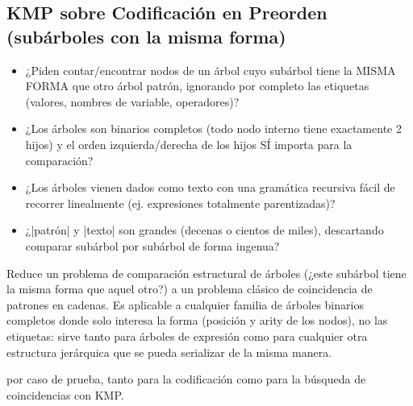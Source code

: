\subsection{KMP sobre Codificación en Preorden (subárboles con la misma forma)}
\label{alg:9-3}


\begin{itemize}
\item ¿Piden contar/encontrar nodos de un árbol cuyo subárbol tiene la MISMA FORMA que otro árbol patrón, ignorando por completo las etiquetas (valores, nombres de variable, operadores)?
\item ¿Los árboles son binarios completos (todo nodo interno tiene exactamente 2 hijos) y el orden izquierda/derecha de los hijos SÍ importa para la comparación?
\item ¿Los árboles vienen dados como texto con una gramática recursiva fácil de recorrer linealmente (ej. expresiones totalmente parentizadas)?
\item ¿|patrón| y |texto| son grandes (decenas o cientos de miles), descartando comparar subárbol por subárbol de forma ingenua?
\end{itemize}

 Reduce un problema de comparación estructural de árboles (¿este subárbol tiene la misma forma que aquel otro?) a un problema clásico de coincidencia de patrones en cadenas. Es aplicable a cualquier familia de árboles binarios completos donde solo interesa la forma (posición y arity de los nodos), no las etiquetas: sirve tanto para árboles de expresión como para cualquier otra estructura jerárquica que se pueda serializar de la misma manera.

 \bigO{|\alpha| + |\beta|} por caso de prueba, tanto para la codificación como para la búsqueda de coincidencias con KMP.

